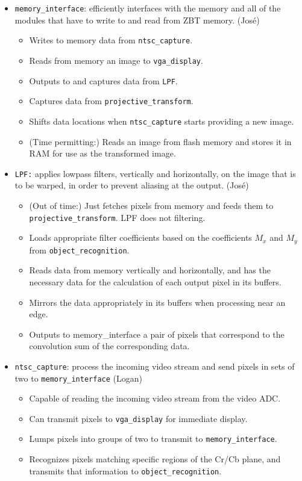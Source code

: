 \documentclass{article}
\begin{document}
\begin{itemize}
\item[] {\tt memory\_interface}: efficiently interfaces with the memory and all of the modules that have to write to and read from ZBT memory. (Jos\'{e})
	\begin{itemize}
	\item Writes to memory data from {\tt ntsc\_capture}.
	\item Reads from memory an image to {\tt vga\_display}.
	\item Outputs to and captures data from {\tt LPF}.
	\item Captures data from {\tt projective\_transform}.
	\item Shifts data locations when {\tt ntsc\_capture} starts providing a new image.
	\item (Time permitting:) Reads an image from flash memory and stores it in RAM for use as the transformed image.
	\end{itemize}

\item[] {\tt LPF:} applies lowpass filters, vertically and horizontally, on the image that is to be warped, in order to prevent aliasing at the output. (Jos\'{e})
	\begin{itemize}
	\item (Out of time:) Just fetches pixels from memory and feeds them to {\tt projective\_transform}. LPF does not filtering.
	\item Loads appropriate filter coefficients based on the coefficients $M_x$ and $M_y$ from {\tt object\_recognition}.
	\item Reads data from memory vertically and horizontally, and has the necessary data for the calculation of each output pixel in its buffers.
	\item Mirrors the data appropriately in its buffers when processing near an edge.
	\item Outputs to memory\_interface a pair of pixels that correspond to the convolution sum of the corresponding data.
	\end{itemize}

\item[] {\tt ntsc\_capture}: process the incoming video stream and send pixels in sets of two to {\tt memory\_interface} (Logan)
	\begin{itemize}
	\item Capable of reading the incoming video stream from the video ADC.
	\item Can transmit pixels to {\tt vga\_display} for immediate display.
	\item Lumps pixels into groups of two to transmit to {\tt memory\_interface}.
	\item Recognizes pixels matching specific regions of the Cr/Cb plane, and transmits that information to {\tt object\_recognition}.
	\end{itemize}


\end{itemize}
\end{document}
